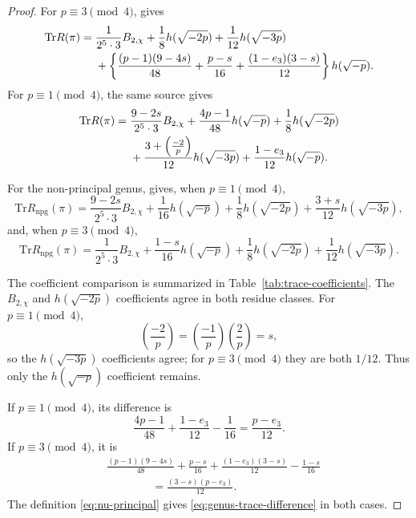 \documentclass[11pt]{amsart}
\theoremstyle{plain}
\theoremstyle{definition}
\newcommand{\Tr}{\mathrm{Tr}}
\providecommand{\kro}[2]{\left(\frac{#1}{#2}\right)}
\begin{document}
	\begin{proof}
		For $p\equiv3\pmod4$, \cite[Rem.~3]{IbukiyamaKatsura} gives
		\begin{align}
			\Tr R(\pi)
			={}&\frac{1}{2^5\cdot3}B_{2,\chi}
			+\frac18h(\sqrt{-2p})
			+\frac1{12}h(\sqrt{-3p}) \notag\\
			&+\left\{
			\frac{(p-1)(9-4s)}{48}
			+\frac{p-s}{16}
			+\frac{(1-e_3)(3-s)}{12}
			\right\}h(\sqrt{-p}).
			\label{eq:principal-trace-3mod4}
		\end{align}
		For $p\equiv1\pmod4$, the same source gives
		\begin{align}
			\Tr R(\pi)
			={}&\frac{9-2s}{2^5\cdot3}B_{2,\chi}
			+\frac{4p-1}{48}h(\sqrt{-p})
			+\frac18h(\sqrt{-2p}) \notag\\
			&+\frac{3+\kro{-2}{p}}{12}h(\sqrt{-3p})
			+\frac{1-e_3}{12}h(\sqrt{-p}).
			\label{eq:principal-trace-1mod4}
		\end{align}
		
		For the non-principal genus, \cite[Thm.~5.2]{Ibukiyama2019quinary} gives,
		when $p\equiv1\pmod4$,
		\begin{equation}
			\Tr R_{\mathrm{npg}}(\pi)
			=\frac{9-2s}{2^5\cdot3}B_{2,\chi}
			+\frac1{16}h(\sqrt{-p})
			+\frac18h(\sqrt{-2p})
			+\frac{3+s}{12}h(\sqrt{-3p}),
			\label{eq:TOH1}
		\end{equation}
		and, when $p\equiv3\pmod4$,
		\begin{equation}
			\Tr R_{\mathrm{npg}}(\pi)
			=\frac{1}{2^5\cdot3}B_{2,\chi}
			+\frac{1-s}{16}h(\sqrt{-p})
			+\frac18h(\sqrt{-2p})
			+\frac1{12}h(\sqrt{-3p}).
			\label{eq:TOH3}
		\end{equation}
		
		The coefficient comparison is summarized in
		Table~\ref{tab:trace-coefficients}. The $B_{2,\chi}$ and
		$h(\sqrt{-2p})$ coefficients agree in both residue classes. For
		$p\equiv1\pmod4$,
		\[
		\kro{-2}{p}=\kro{-1}{p}\kro{2}{p}=s,
		\]
		so the $h(\sqrt{-3p})$ coefficients agree; for $p\equiv3\pmod4$ they
		are both $1/12$. Thus only the $h(\sqrt{-p})$ coefficient remains.
		
		If $p\equiv1\pmod4$, its difference is
		\[
		\frac{4p-1}{48}+\frac{1-e_3}{12}-\frac1{16}
		=\frac{p-e_3}{12}.
		\]
		If $p\equiv3\pmod4$, it is
		\begin{align*}
			&\frac{(p-1)(9-4s)}{48}
			+\frac{p-s}{16}
			+\frac{(1-e_3)(3-s)}{12}
			-\frac{1-s}{16}\\
			&\hspace{4em}=
			\frac{(3-s)(p-e_3)}{12}.
		\end{align*}
		The definition \eqref{eq:nu-principal} gives
		\eqref{eq:genus-trace-difference} in both cases.
	\end{proof}
	
\end{document}
